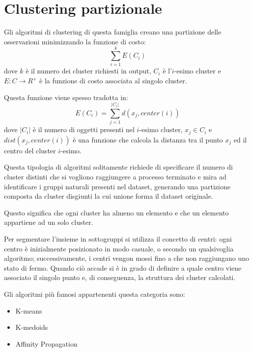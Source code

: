 \section{Clustering partizionale}
	Gli algoritmi di clustering di questa famiglia creano una partizione delle osservazioni minimizzando la funzione di costo:
	\begin{equation*}
	  \sum_{i=1}^{k}{E(C_i)}
	\end{equation*}
	dove $k$ è il numero dei cluster richiesti in output, $C_i$ è l'$i$-esimo cluster e $E:C \rightarrow R^{+}$ è la funzione di costo associata al singolo cluster.

	Questa funzione viene spesso tradotta in\cite{funzione_costo}:
	\begin{equation*}
	  	E(C_i) = \sum_{j=1}^{|C_i|}{d(x_j, center(i))}
	\end{equation*}
	dove $|C_i|$ è il numero di oggetti presenti nel $i$-esimo cluster, $x_j \in C_i$  e $dist(x_j, center(i))$ è una funzione che calcola la distanza tra il punto $x_j$ ed il centro del cluster $i$-esimo.

	Questa tipologia di algoritmi solitamente richiede di specificare il numero di cluster distinti che si vogliono raggiungere a processo terminato e mira ad identificare i gruppi naturali presenti nel dataset, generando una partizione composta da cluster disgiunti la cui unione forma il dataset originale.

	Questo significa che ogni cluster ha almeno un elemento e che un elemento appartiene ad un solo cluster.

	Per segmentare l'insieme in sottogruppi si utilizza il concetto di centri: ogni centro è inizialmente posizionato in modo casuale, o secondo un qualsivoglia algoritmo; successivamente, i centri vengon mossi fino a che non raggiungano uno stato di fermo. Quando ciò accade si è in grado di definire a quale centro viene associato il singolo punto e, di conseguenza, la struttura dei cluster calcolati. 

	Gli algoritmi più famosi appartenenti questa categoria sono: 
	\begin{itemize}
	  	\item K-means
	  	\item K-medoids
	  	\item Affinity Propagation
	\end{itemize}
